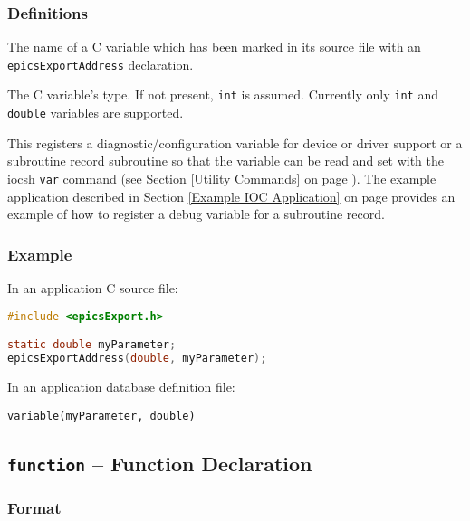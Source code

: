 \subsubsection{Definitions}

\begin{description}
\item [variable\_name] The name of a C variable which has been marked in its source file with an 
\verb|epicsExportAddress| declaration.

\item [type] The C variable's type.
If not present, \verb|int| is assumed.
Currently only \verb|int| and \verb|double| variables are supported.
\end{description}

This registers a diagnostic/configuration variable for device or driver support or a subroutine record subroutine so that
the variable can be read and set with the iocsh \verb|var| command (see Section \ref{Utility Commands} on page \pageref{Utility Commands}).
The example application described in Section \ref{Example IOC Application} on page \pageref{Example IOC Application}
provides an example of how to register a debug variable for a subroutine record.

\subsubsection{Example}

In an application C source file:

\begin{lstlisting}[language=C]
#include <epicsExport.h>

static double myParameter;
epicsExportAddress(double, myParameter);
\end{lstlisting}

In an application database definition file:

\begin{lstlisting}[language=dbd]
variable(myParameter, double)
\end{lstlisting}

\subsection{\texttt{function} -- Function Declaration}

\subsubsection{Format}

